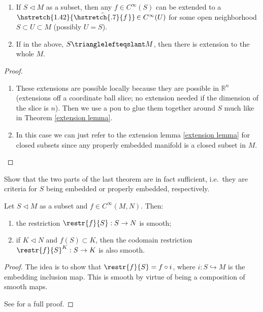 \documentclass[english,letterpaper]{article}%
\numberwithin{equation}{section}
\numberwithin{figure}{section}
\numberwithin{table}{section}
\theoremstyle{definition}
\theoremstyle{definition}
\theoremstyle{definition}
\theoremstyle{plain}
\theoremstyle{plain}
\theoremstyle{plain}
\theoremstyle{plain}
\theoremstyle{remark}
\theoremstyle{remark}
\newcommand{\sub}{\vartriangleleft}
\newcommand{\sube}{\trianglelefteqslant}
\newcommand\wt[1]{\hstretch{1.42}{\tilde{\hstretch{.7}{#1\mkern2mu}}}\mkern-2mu}
\begin{document}
\begin{thm}
\begin{enumerate}
    \item If $S\sub M$ as a subset, then any $f\in C^\infty(S)$ can be extended to a $\wt f\in C^\infty(U)$ for some open neighborhood $S\subset U\subset M$ (possibly $U=S$).
    \item If in the above, $S\sube M$, then there is extension to the whole $M$.
\end{enumerate}
\end{thm}
\begin{proof}
\begin{enumerate}
    \item These extensions are possible locally because they are possible in $\mathbb{R}^n$ (extensions off a coordinate ball slice; no extension needed if the dimension of the slice is $n$). Then we use a \gls{pou} to glue them together around $S$ much like in Theorem \ref{extension lemma}.
    \item In this case we can just refer to the extension lemma \ref{extension lemma} for closed subsets since any properly embedded manifold is a closed subset in $M$.
\end{enumerate}
\end{proof}

\begin{xca}
Show that the two parts of the last theorem are in fact sufficient, i.e.\ they are criteria for $S$ being embedded or properly embedded, respectively.
\end{xca}

\begin{thm}
Let $S\sub M$ as a subset and $f\in C^\infty(M,N)$. Then:
\begin{enumerate}
    \item the restriction $\restr{f}{S}:S\to N$ is smooth;
    \item if $K\sub N$ and $f(S)\subset K$, then the codomain restriction $\restr{f}{S}^{K}:S\to K$ is also smooth.
\end{enumerate}
\end{thm}
\begin{proof}
The idea is to show that $\restr{f}{S}=f\circ i$, where $i:S\hookrightarrow M$ is the embedding inclusion map. This is smooth by virtue of being a composition of smooth maps.

See \cite[Thm 5.27 and below]{Lee} for a full proof.
\end{proof}
\end{document}
